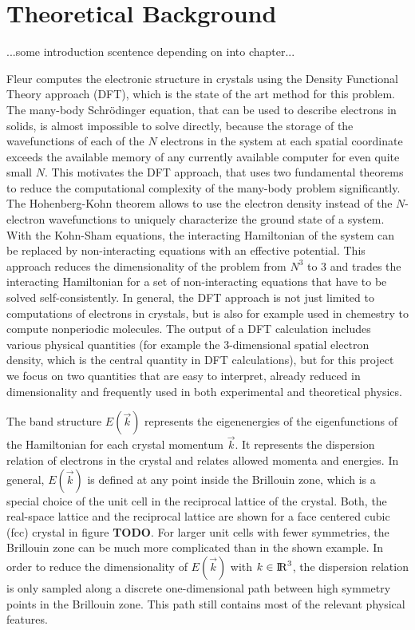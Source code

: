 
\chapter{Theoretical Background}
\label{chap:theory}

...some introduction scentence depending on into chapter...


Fleur computes the electronic structure in crystals using the Density Functional Theory approach (DFT), which is the state of the art method for this problem. The many-body Schrödinger equation, that can be used to describe electrons in solids, is almost impossible to solve directly, because the storage of the wavefunctions of each of the $N$ electrons in the system at each spatial coordinate exceeds the available memory of any currently available computer for even quite small $N$. This motivates the DFT approach, that uses two fundamental theorems to reduce the computational complexity of the many-body problem significantly. The Hohenberg-Kohn theorem allows to use the electron density instead of the $N$-electron wavefunctions to uniquely characterize the ground state of a system. With the Kohn-Sham equations, the interacting Hamiltonian of the system can be replaced by non-interacting equations with an effective potential. This approach reduces the dimensionality of the problem from $N^3$ to $3$ and trades the interacting Hamiltonian for a set of non-interacting equations that have to be solved self-consistently. In general, the DFT approach is not just limited to computations of electrons in crystals, but is also for example used in chemestry to compute nonperiodic molecules.
% 
The output of a DFT calculation includes various physical quantities (for example the 3-dimensional spatial electron density, which is the central quantity in DFT calculations), but for this project we focus on two quantities that are easy to interpret, already reduced in dimensionality and frequently used in both experimental and theoretical physics.

The band structure $E(\vec{k})$ represents the eigenenergies of the eigenfunctions of the Hamiltonian for each crystal momentum $\vec{k}$. It represents the dispersion relation of electrons in the crystal and relates allowed momenta and energies. In general, $E(\vec{k})$ is defined at any point inside the Brillouin zone, which is a special choice of the unit cell in the reciprocal lattice of the crystal. Both, the real-space lattice and the reciprocal lattice are shown for a face centered cubic (fcc) crystal in figure \textbf{TODO}. For larger unit cells with fewer symmetries, the Brillouin zone can be much more complicated than in the shown example. In order to reduce the dimensionality of $E(\vec{k})$ with $k \in {\rm I\!R}^3$, the dispersion relation is only sampled along a discrete one-dimensional path between high symmetry points in the Brillouin zone. This path still contains most of the relevant physical features.

